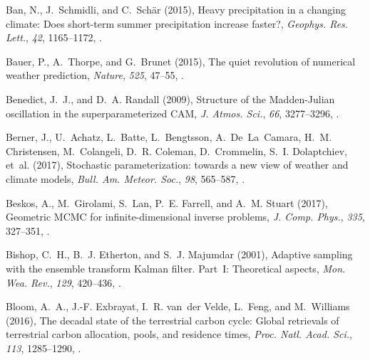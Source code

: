 \documentclass[draft]{agujournal}
\begin{document}
\begin{thebibliography}{196}
Ban, N., J.~Schmidli, and C.~Sch{\"a}r (2015), Heavy precipitation in a
  changing climate: Does short-term summer precipitation increase faster?,
  \textit{Geophys. Res. Lett.}, \textit{42}, 1165--1172,
  .

Bauer, P., A.~Thorpe, and G.~Brunet (2015), The quiet revolution of numerical
  weather prediction, \textit{Nature}, \textit{525}, 47--55,
  .

Benedict, J.~J., and D.~A. Randall (2009), Structure of the {M}adden-{J}ulian
  oscillation in the superparameterized {CAM}, \textit{J. Atmos. Sci.},
  \textit{66}, 3277--3296, .

Berner, J., U.~Achatz, L.~Batte, L.~Bengtsson, A.~De~La~Camara, H.~M.
  Christensen, M.~Colangeli, D.~R. Coleman, D.~Crommelin, S.~I. Dolaptchiev,
  et~al. (2017), Stochastic parameterization: towards a new view of weather and
  climate models, \textit{Bull. Am. Meteor. Soc.}, \textit{98}, 565--587,
  .

Beskos, A., M.~Girolami, S.~Lan, P.~E. Farrell, and A.~M. Stuart (2017),
  Geometric {MCMC} for infinite-dimensional inverse problems, \textit{J. Comp.
  Phys.}, \textit{335}, 327--351, .

Bishop, C.~H., B.~J. Etherton, and S.~J. Majumdar (2001), Adaptive sampling
  with the ensemble transform {K}alman filter. {Part~I}: Theoretical aspects,
  \textit{Mon. Wea. Rev.}, \textit{129}, 420--436,
  .

Bloom, A.~A., J.-F. Exbrayat, I.~R. van~der Velde, L.~Feng, and M.~Williams
  (2016), The decadal state of the terrestrial carbon cycle: Global retrievals
  of terrestrial carbon allocation, pools, and residence times, \textit{Proc.
  Natl. Acad. Sci.}, \textit{113}, 1285--1290,
  .


\end{thebibliography}
\end{document}

